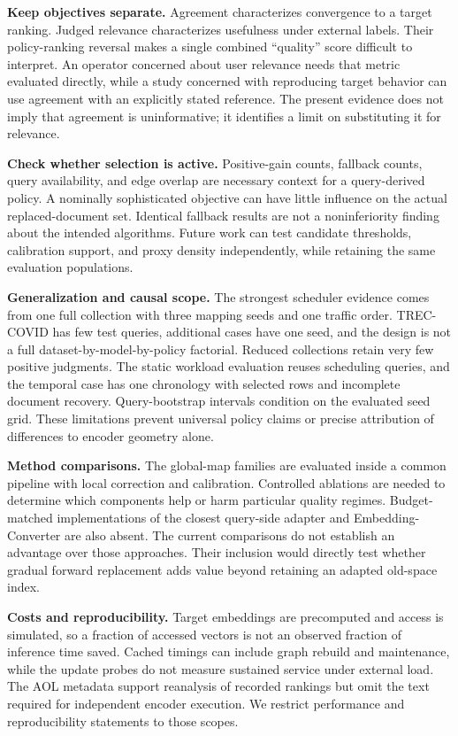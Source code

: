 \documentclass[runningheads]{llncs}
\begin{document}
\textbf{Keep objectives separate.} Agreement characterizes convergence to a target ranking. Judged relevance characterizes usefulness under external labels. Their policy-ranking reversal makes a single combined ``quality'' score difficult to interpret. An operator concerned about user relevance needs that metric evaluated directly, while a study concerned with reproducing target behavior can use agreement with an explicitly stated reference. The present evidence does not imply that agreement is uninformative; it identifies a limit on substituting it for relevance.

\textbf{Check whether selection is active.} Positive-gain counts, fallback counts, query availability, and edge overlap are necessary context for a query-derived policy. A nominally sophisticated objective can have little influence on the actual replaced-document set. Identical fallback results are not a noninferiority finding about the intended algorithms. Future work can test candidate thresholds, calibration support, and proxy density independently, while retaining the same evaluation populations.

\textbf{Generalization and causal scope.} The strongest scheduler evidence comes from one full collection with three mapping seeds and one traffic order. TREC-COVID has few test queries, additional cases have one seed, and the design is not a full dataset-by-model-by-policy factorial. Reduced collections retain very few positive judgments. The static workload evaluation reuses scheduling queries, and the temporal case has one chronology with selected rows and incomplete document recovery. Query-bootstrap intervals condition on the evaluated seed grid. These limitations prevent universal policy claims or precise attribution of differences to encoder geometry alone.

\textbf{Method comparisons.} The global-map families are evaluated inside a common pipeline with local correction and calibration. Controlled ablations are needed to determine which components help or harm particular quality regimes. Budget-matched implementations of the closest query-side adapter and Embedding-Converter are also absent. The current comparisons do not establish an advantage over those approaches. Their inclusion would directly test whether gradual forward replacement adds value beyond retaining an adapted old-space index.

\textbf{Costs and reproducibility.} Target embeddings are precomputed and access is simulated, so a fraction of accessed vectors is not an observed fraction of inference time saved. Cached timings can include graph rebuild and maintenance, while the update probes do not measure sustained service under external load. The AOL metadata support reanalysis of recorded rankings but omit the text required for independent encoder execution. We restrict performance and reproducibility statements to those scopes.
\end{document}
